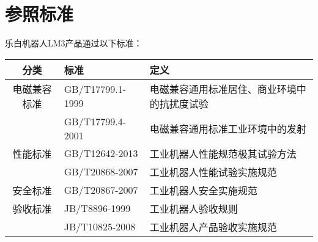 \chapter{参照标准}
\label{app:参照标准}

乐白机器人LM3产品通过以下标准：

\begin{tabular}{cll}
分类    &   标准    &  定义\\\hline
电磁兼容标准    &   GB/T17799.1-1999    &  电磁兼容通用标准居住、商业环境中的抗扰度试验\\
    &   GB/T17799.4-2001    &  电磁兼容通用标准工业环境中的发射\\
性能标准    &   GB/T12642-2013  &  工业机器人性能规范极其试验方法\\
    &   GB/T20868-2007  &  工业机器人性能试验实施规范\\
安全标准    &   GB/T20867-2007  &  工业机器人安全实施规范\\
验收标准    &   JB/T8896-1999   &  工业机器人验收规则\\
    &   JB/T10825-2008  &	工业机器人产品验收实施规范\\
\end{tabular}
